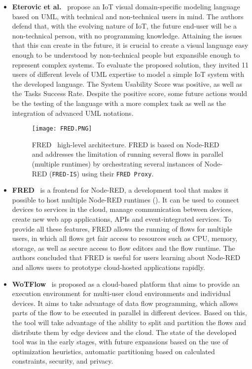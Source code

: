 \begin{itemize}
\item\textbf{Eterovic et al.}~\cite{vpl_uml} propose an IoT visual domain-specific modeling language based on UML, with technical and non-technical users in mind. The authors defend that, with the evolving nature of IoT, the future end-user will be a non-technical person, with no programming knowledge. Attaining the issues that this can create in the future, it is crucial to create a visual language easy enough to be understood by non-technical people but expansible enough to represent complex systems. To evaluate the proposed solution, they invited 11 users of different levels of UML expertise to model a simple IoT system with the developed language. The System Usability Score was positive, as well as the Tasks Success Rate. Despite the positive score, some future actions would be the testing of the language with a more complex task as well as the integration of advanced UML notations.

\begin{figure}[h]
\centering
\texttt{[image: FRED.PNG]}
\caption[FRED high-level architecture.]{FRED~\cite{fred} high-level architecture. FRED is based on Node-RED and addresses the limitation of running several flows in parallel (multiple runtimes) by orchestrating several instances of Node-RED (\texttt{FRED-IS}) using their \texttt{FRED Proxy}.}\label{fig:fred1}
\end{figure}    

\item\textbf{FRED}~\cite{fred} is a frontend for Node-RED, a development tool that makes it possible to host multiple Node-RED runtimes (). It can be used to connect devices to services in the cloud, manage communication between devices, create new web app applications, APIs and event-integrated services. To provide all these features, FRED allows the running of flows for multiple users, in which all flows get fair access to resources such as CPU, memory, storage, as well as secure access to flow editors and the flow runtime. The authors concluded that FRED is useful for users learning about Node-RED and allows users to prototype cloud-hosted applications rapidly.

\item\textbf{WoTFlow}~\cite{wotflow_dnr} is proposed as a cloud-based platform that aims to provide an execution environment for multi-user cloud environments and individual devices. It aims to take advantage of data flow programming, which allows parts of the flow to be executed in parallel in different devices. Based on this, the tool will take advantage of the ability to split and partition the flows and distribute them by edge devices and the cloud. The state of the developed tool was in the early stages, with future expansions based on the use of optimization heuristics, automatic partitioning based on calculated constraints, security, and privacy.


\end{itemize}
